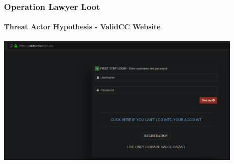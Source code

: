 \documentclass[aspectratio=169]{beamer}
\begin{document}
{
\begin{frame}
  \frametitle{Operation Lawyer Loot}
  \framesubtitle{Threat Actor Hypothesis - ValidCC Website}
  \begin{center}
    \includegraphics[width=12cm]{validcc-website}
  \end{center}
\end{frame}
}
\end{document}
